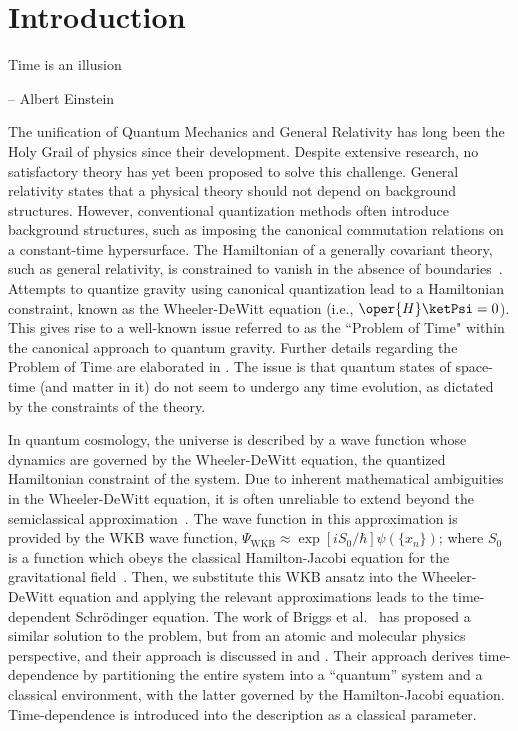 \chapter{Introduction\label{chap:introduction}}

\epigraph{ \myopeningquote Time is an illusion \myclosingquote}{-- Albert Einstein}

The unification of Quantum Mechanics and General Relativity has long been the Holy Grail of physics 
since their development. Despite extensive research, no satisfactory theory has yet been proposed 
to solve this challenge. General relativity states that a physical theory should not depend on 
background structures. However, conventional quantization methods often introduce background structures, 
such as imposing the canonical commutation relations on a constant-time hypersurface. The Hamiltonian 
of a generally covariant theory, such as general relativity, is constrained to vanish in the absence 
of boundaries~\cite{gielen2023quantum}. Attempts to quantize gravity using canonical quantization 
lead to a Hamiltonian constraint, known as the Wheeler-DeWitt equation (i.e., \(\oper{H} \ketPsi = 0\)). 
This gives rise to a well-known issue referred to as the ``Problem of Time" within the canonical 
approach to quantum gravity. Further details regarding the Problem of Time are elaborated in 
. The issue is that quantum 
states of space-time (and matter in it) do not seem to undergo any time evolution, as dictated by 
the constraints of the theory.

In quantum cosmology, the universe is described by a wave function whose dynamics are governed 
by the Wheeler-DeWitt equation, the quantized Hamiltonian constraint of the system. Due to inherent 
mathematical ambiguities in the Wheeler-DeWitt equation, it is often unreliable to extend beyond the 
semiclassical approximation~\cite{cooke2010qcintro}. The wave function in this approximation is provided 
by the WKB wave function, \(\Psi_{\mathrm{WKB}} 
\approx \exp\left[iS_0/\hbar\right]\psi(\{x_n\})\); where \(S_0\) is a function which obeys the classical 
Hamilton-Jacobi equation for the gravitational field~\cite{gielen2023quantum}. Then, we substitute this 
WKB ansatz into the Wheeler-DeWitt equation and applying the relevant approximations leads to the 
time-dependent Schr\"odinger equation. The work of Briggs et al.~\cite{briggsBraun2004, briggs2001derivation} 
has proposed a similar solution to the problem, but from an atomic and molecular physics perspective, 
and their approach is discussed in  and .
Their approach derives time-dependence by partitioning the entire system into a ``quantum'' system and a classical 
environment, with the latter governed by the Hamilton-Jacobi equation. Time-dependence is introduced into the 
description as a classical parameter.

